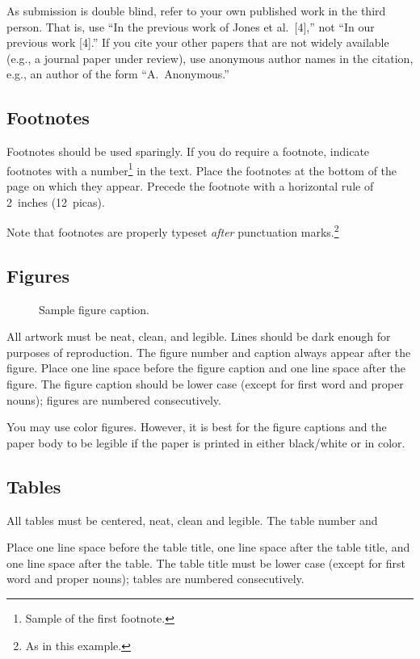 \documentclass{article}
\begin{document}
As submission is double blind, refer to your own published work in the third
person. That is, use ``In the previous work of Jones et al.\ [4],'' not ``In our
previous work [4].'' If you cite your other papers that are not widely available
(e.g., a journal paper under review), use anonymous author names in the
citation, e.g., an author of the form ``A.\ Anonymous.''

\subsection{Footnotes}

Footnotes should be used sparingly.  If you do require a footnote, indicate
footnotes with a number\footnote{Sample of the first footnote.} in the
text. Place the footnotes at the bottom of the page on which they appear.
Precede the footnote with a horizontal rule of 2~inches (12~picas).

Note that footnotes are properly typeset \emph{after} punctuation
marks.\footnote{As in this example.}

\subsection{Figures}

\begin{figure}
  \centering
  \fbox{\rule[-.5cm]{0cm}{4cm} \rule[-.5cm]{4cm}{0cm}}
  \caption{Sample figure caption.}
\end{figure}

All artwork must be neat, clean, and legible. Lines should be dark enough for
purposes of reproduction. The figure number and caption always appear after the
figure. Place one line space before the figure caption and one line space after
the figure. The figure caption should be lower case (except for first word and
proper nouns); figures are numbered consecutively.

You may use color figures.  However, it is best for the figure captions and the
paper body to be legible if the paper is printed in either black/white or in
color.

\subsection{Tables}

All tables must be centered, neat, clean and legible.  The table number and

Place one line space before the table title, one line space after the
table title, and one line space after the table. The table title must
be lower case (except for first word and proper nouns); tables are
numbered consecutively.
\end{document}
